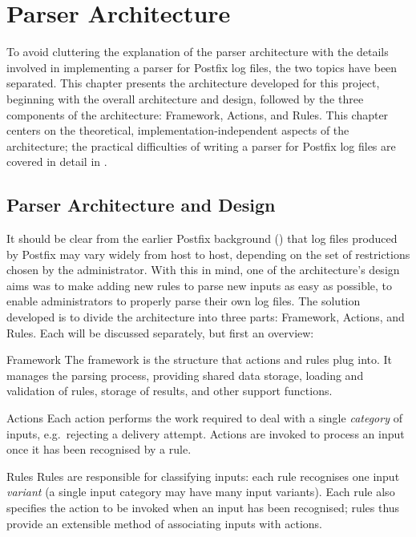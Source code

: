 \chapter{Parser Architecture}

\label{parser architecture}

To avoid cluttering the explanation of the parser architecture with the
details involved in implementing a parser for Postfix log files, the two
topics have been separated.  This chapter presents the architecture
developed for this project, beginning with the overall architecture and
design, followed by the three components of the architecture: Framework,
Actions, and Rules.  This chapter centers on the theoretical,
implementation-independent aspects of the architecture; the practical
difficulties of writing a parser for Postfix log files are covered in
detail in .

\section{Parser Architecture and Design}

\label{parser design}

It should be clear from the earlier Postfix background () that log files produced by Postfix may vary widely from host
to host, depending on the set of restrictions chosen by the administrator.
With this in mind, one of the architecture's design aims was to make adding
new rules to parse new inputs as easy as possible, to enable administrators
to properly parse their own log files.  The solution developed is to divide
the architecture into three parts: Framework, Actions, and Rules.  Each
will be discussed separately, but first an overview:

\begin{eqlist}

    \item [Framework]  The framework is the structure that actions and
        rules plug into.  It manages the parsing process, providing shared
        data storage, loading and validation of rules, storage of results,
        and other support functions.

    \item [Actions] Each action performs the work required to deal with a
        single \textit{category\/} of inputs, e.g.\ rejecting a delivery
        attempt.  Actions are invoked to process an input once it has been
        recognised by a rule.

    \item [Rules]  Rules are responsible for classifying inputs: each rule
        recognises one input \textit{variant\/} (a single input category
        may have many input variants).  Each rule also specifies the action
        to be invoked when an input has been recognised; rules thus provide
        an extensible method of associating inputs with actions.

\end{eqlist}

